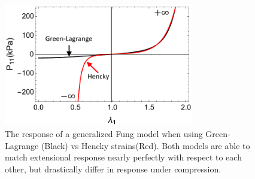     
\begin{figure}
\centering
\includegraphics[width=3.25in]{Figures/gvsecompression}
\caption{The response of a generalized Fung model when using Green-Lagrange (Black) vs Hencky strains(Red). Both models are able to match extensional response nearly perfectly with respect to each other, but drastically differ in response under compression.}
\label{fig:gvsecompression}
\end{figure}


	





